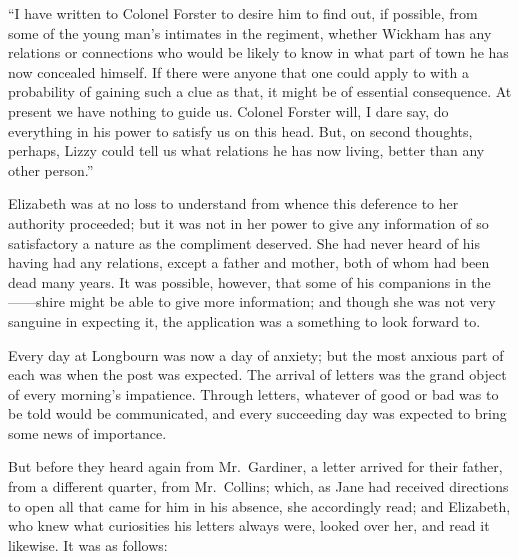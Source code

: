 \documentclass[12pt,english,oneside]{book}
\begin{document}
{}``I have written to Colonel Forster to desire him to find out,
if possible, from some of the young man's intimates in the regiment,
whether Wickham has any relations or connections who would be likely
to know in what part of town he has now concealed himself. If there
were anyone that one could apply to with a probability of gaining
such a clue as that, it might be of essential consequence. At present
we have nothing to guide us. Colonel Forster will, I dare say, do
everything in his power to satisfy us on this head. But, on second
thoughts, perhaps, Lizzy could tell us what relations he has now living,
better than any other person.''

Elizabeth was at no loss to understand from whence this deference
to her authority proceeded; but it was not in her power to give any
information of so satisfactory a nature as the compliment deserved.
She had never heard of his having had any relations, except a father
and mother, both of whom had been dead many years. It was possible,
however, that some of his companions in the \mbox{------}shire might
be able to give more information; and though she was not very sanguine
in expecting it, the application was a something to look forward to.

Every day at Longbourn was now a day of anxiety; but the most anxious
part of each was when the post was expected. The arrival of letters
was the grand object of every morning's impatience. Through letters,
whatever of good or bad was to be told would be communicated, and
every succeeding day was expected to bring some news of importance.

But before they heard again from Mr.\ Gardiner, a letter arrived
for their father, from a different quarter, from Mr.\ Collins; which,
as Jane had received directions to open all that came for him in his
absence, she accordingly read; and Elizabeth, who knew what curiosities
his letters always were, looked over her, and read it likewise. It
was as follows:
\end{document}

